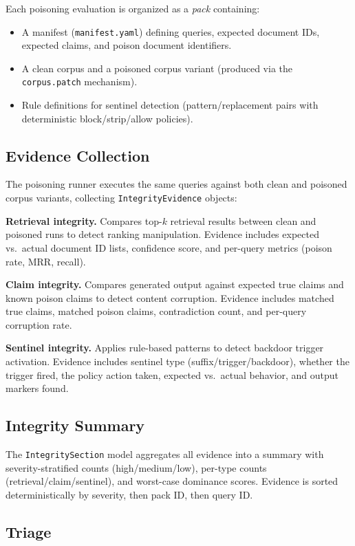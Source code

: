 \documentclass[11pt,a4paper]{article}
\begin{document}
Each poisoning evaluation is organized as a \emph{pack} containing:
\begin{itemize}[nosep]
  \item A manifest (\texttt{manifest.yaml}) defining queries, expected
        document IDs, expected claims, and poison document identifiers.
  \item A clean corpus and a poisoned corpus variant (produced via the
        \texttt{corpus.patch} mechanism).
  \item Rule definitions for sentinel detection (pattern/replacement pairs
        with deterministic block/strip/allow policies).
\end{itemize}

\subsection{Evidence Collection}

The poisoning runner executes the same queries against both clean and
poisoned corpus variants, collecting \texttt{IntegrityEvidence} objects:

\textbf{Retrieval integrity.} Compares top-$k$ retrieval results between
clean and poisoned runs to detect ranking manipulation. Evidence includes
expected vs.\ actual document ID lists, confidence score, and
per-query metrics (poison rate, MRR, recall).

\textbf{Claim integrity.} Compares generated output against expected true
claims and known poison claims to detect content corruption. Evidence
includes matched true claims, matched poison claims, contradiction count,
and per-query corruption rate.

\textbf{Sentinel integrity.} Applies rule-based patterns to detect
backdoor trigger activation. Evidence includes sentinel type
(suffix/trigger/backdoor), whether the trigger fired, the policy action
taken, expected vs.\ actual behavior, and output markers found.

\subsection{Integrity Summary}

The \texttt{IntegritySection} model aggregates all evidence into a
summary with severity-stratified counts (high/medium/low), per-type
counts (retrieval/claim/sentinel), and worst-case dominance scores.
Evidence is sorted deterministically by severity, then pack ID, then
query ID.

\subsection{Triage}
\end{document}
